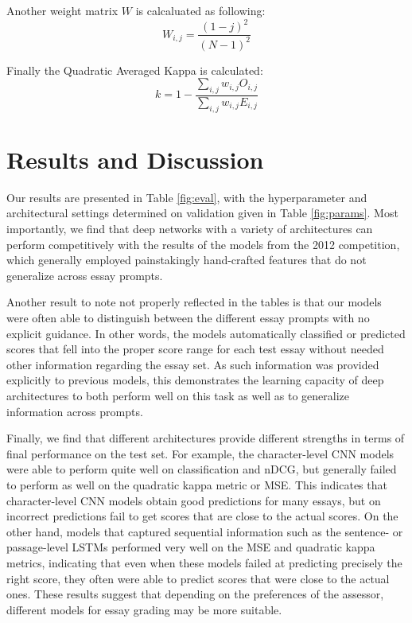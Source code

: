 \documentclass[10pt,psamsfonts]{amsart}
\theoremstyle{definition}
\theoremstyle{remark}
\numberwithin{equation}{section}
\begin{document}
Another weight matrix $W$ is calcaluated as following:
$$
W_{i,j} = \frac{(1-j)^2}{(N-1)^2}
$$

Finally the Quadratic Averaged Kappa is calculated:
$$
k = 1 - \frac{\sum_{i,j}w_{i,j}O_{i,j}}{\sum_{i,j}w_{i,j}E_{i,j}}
$$




\section*{Results and Discussion}

Our results are presented in Table \ref{fig:eval}, with the hyperparameter and architectural settings determined on validation given in Table \ref{fig:params}. Most importantly, we find that deep networks with a variety of architectures can perform competitively with the results of the models from the 2012 competition, which generally employed painstakingly hand-crafted features that do not generalize across essay prompts.

Another result to note not properly reflected in the tables is that our models were often able to distinguish between the different essay prompts with no explicit guidance. In other words, the models automatically classified or predicted scores that fell into the proper score range for each test essay without needed other information regarding the essay set. As such information was provided explicitly to previous models, this demonstrates the learning capacity of deep architectures to both perform well on this task as well as to generalize information across prompts.

Finally, we find that different architectures provide different strengths in terms of final performance on the test set. For example, the character-level CNN models were able to perform quite well on classification and nDCG, but generally failed to perform as well on the quadratic kappa metric or MSE. This indicates that character-level CNN models obtain good predictions for many essays, but on incorrect predictions fail to get scores that are close to the actual scores. On the other hand, models that captured sequential information such as the sentence- or passage-level LSTMs performed very well on the MSE and quadratic kappa metrics, indicating that even when these models failed at predicting precisely the right score, they often were able to predict scores that were close to the actual ones. These results suggest that depending on the preferences of the assessor, different models for essay grading may be more suitable.
\end{document}
